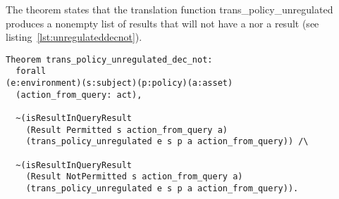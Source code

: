 The theorem  states that the translation function trans_policy_unregulated produces a nonempty list of results that will not have a  nor a  result (see listing~\ref{lst:unregulateddecnot}).


\begin{lstlisting}
Theorem trans_policy_unregulated_dec_not:
  forall 
(e:environment)(s:subject)(p:policy)(a:asset)
  (action_from_query: act),
 
  ~(isResultInQueryResult 
    (Result Permitted s action_from_query a)
    (trans_policy_unregulated e s p a action_from_query)) /\
  
  ~(isResultInQueryResult 
    (Result NotPermitted s action_from_query a)
    (trans_policy_unregulated e s p a action_from_query)).
\end{lstlisting}















